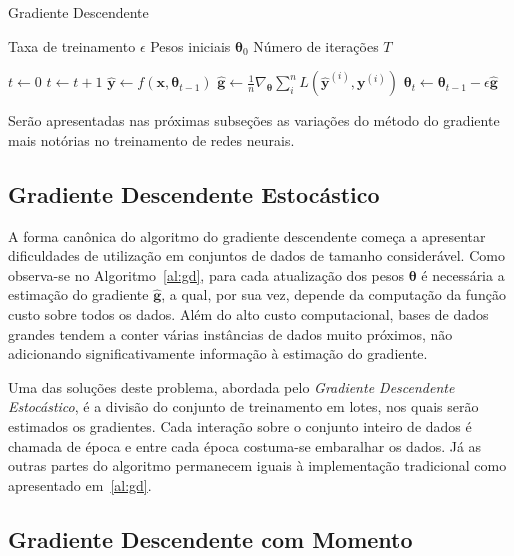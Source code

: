 \begin{algorithm}
    \caption{Gradiente Descendente}
    \label{al:gd}
    \begin{algorithmic}[1]
        \Require Taxa de treinamento $\epsilon$
        \Require Pesos iniciais $\boldsymbol{\theta}_{0}$
        \Require Número de iterações $T$

        \State $t \gets 0$
            \State $t \gets t + 1$
            \State $\mathbf{\hat{y}} \gets f(\mathbf{x}, \boldsymbol{\theta}_{t-1})$
            \State $\mathbf{\hat{g}} \gets \frac{1}{n} \nabla_{\boldsymbol{\theta}} \sum_i^n L(\mathbf{\hat{y}}^{(i)}, \mathbf{y}^{(i)})$
            \State $\boldsymbol{\theta}_{t} \gets \boldsymbol{\theta}_{t-1} - \epsilon \mathbf{\hat{g}}$
        \EndWhile
    \end{algorithmic}
\end{algorithm}

Serão apresentadas nas próximas subseções as variações do método do gradiente mais notórias no treinamento de redes neurais.

\subsection{Gradiente Descendente Estocástico}

A forma canônica do algoritmo do gradiente descendente começa a apresentar dificuldades de utilização em conjuntos de dados de tamanho considerável. Como observa-se no Algoritmo~\ref{al:gd}, para cada atualização dos pesos $\boldsymbol{\theta}$ é necessária a estimação do gradiente $\mathbf{\hat{g}}$, a qual, por sua vez, depende da computação da função custo sobre todos os dados. Além do alto custo computacional, bases de dados grandes tendem a conter várias instâncias de dados muito próximos, não adicionando significativamente informação à estimação do gradiente.

Uma das soluções deste problema, abordada pelo \textit{Gradiente Descendente Estocástico}, é a divisão do conjunto de treinamento em lotes, nos quais serão estimados os gradientes. Cada interação sobre o conjunto inteiro de dados é chamada de época e entre cada época costuma-se embaralhar os dados. Já as outras partes do algoritmo permanecem iguais à implementação tradicional como apresentado em~\ref{al:gd}.

\subsection{Gradiente Descendente com Momento}

